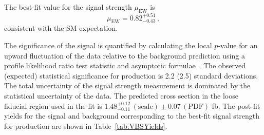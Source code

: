 The best-fit value for the signal strength $\mu_{\mathrm{EW}}$ is 
\begin{equation}
  \mu_{\mathrm{EW}} = 0.82^{+0.51}_{-0.43} \,,
\end{equation}
consistent with the SM expectation. 

The significance of the signal is quantified by calculating the local $p$-value
for an upward fluctuation of the data relative to the background prediction
using a profile likelihood ratio test statistic and asymptotic formulae~\cite{Cowan:2010js}.
The observed (expected) statistical significance for \EWWZ production is 2.2 (2.5) standard deviations. 
The total uncertainty of the signal strength
measurement is dominated by the statistical uncertainty of the data.
The predicted cross section in the loose fiducial region used in the fit is 
$1.48^{+0.12}_{-0.11} \,(\mathrm{scale}) \pm 0.07 \, (\mathrm{PDF})$ fb.
The post-fit yields for the signal and background corresponding to the best-fit signal strength 
for \EWWZ production are shown in
Table~\ref{tab:VBSYields}.

